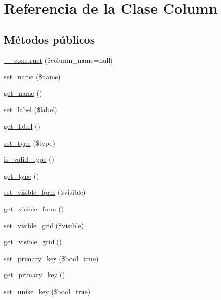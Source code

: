 \hypertarget{class_column}{}\section{Referencia de la Clase Column}
\label{class_column}
\subsection*{Métodos públicos}
\begin{DoxyCompactItemize}
\item 
\mbox{\hyperlink{class_column_a85261de17287659e7bde7e1710fc5916}{\+\_\+\+\_\+construct}} (\$column\+\_\+name=null)
\item 
\mbox{\hyperlink{class_column_adb76436490cc4941cfd8ded9336f3321}{set\+\_\+name}} (\$name)
\item 
\mbox{\hyperlink{class_column_adb3148efdbf2d710ae3d6617ce16781c}{get\+\_\+name}} ()
\item 
\mbox{\hyperlink{class_column_ac17cbac2309c3ab456b818d7be33b2e7}{set\+\_\+label}} (\$label)
\item 
\mbox{\hyperlink{class_column_a119d1743c608b0872a5df560b084ae36}{get\+\_\+label}} ()
\item 
\mbox{\hyperlink{class_column_a7500d02a0114cde3ddb200143d39a2a0}{set\+\_\+type}} (\$type)
\item 
\mbox{\hyperlink{class_column_a585cfab5cbfb826d564eeecd7fc462a7}{is\+\_\+valid\+\_\+type}} ()
\item 
\mbox{\hyperlink{class_column_ae0f1d35fdaae4ba874bba1f0a4db051b}{get\+\_\+type}} ()
\item 
\mbox{\hyperlink{class_column_a66009bdbc227c7cc6764f31152270e08}{set\+\_\+visible\+\_\+form}} (\$visible)
\item 
\mbox{\hyperlink{class_column_a58959194643294bb27c06cf13584f79a}{get\+\_\+visible\+\_\+form}} ()
\item 
\mbox{\hyperlink{class_column_a81a3179f6cfb539a346089975a482da5}{set\+\_\+visible\+\_\+grid}} (\$visible)
\item 
\mbox{\hyperlink{class_column_a1ebf50eb00d5c65b0087cf13c1ceb8fd}{get\+\_\+visible\+\_\+grid}} ()
\item 
\mbox{\hyperlink{class_column_a58d41e83c8ef7f3a021e1070f2e98cd3}{set\+\_\+primary\+\_\+key}} (\$bool=true)
\item 
\mbox{\hyperlink{class_column_a596352fac897c8f8a877a67ab390df76}{get\+\_\+primary\+\_\+key}} ()
\item 
\mbox{\hyperlink{class_column_afc2755d3457a6f80517b6ba695e793cf}{set\+\_\+unike\+\_\+key}} (\$bool=true)

\end{DoxyCompactItemize}
